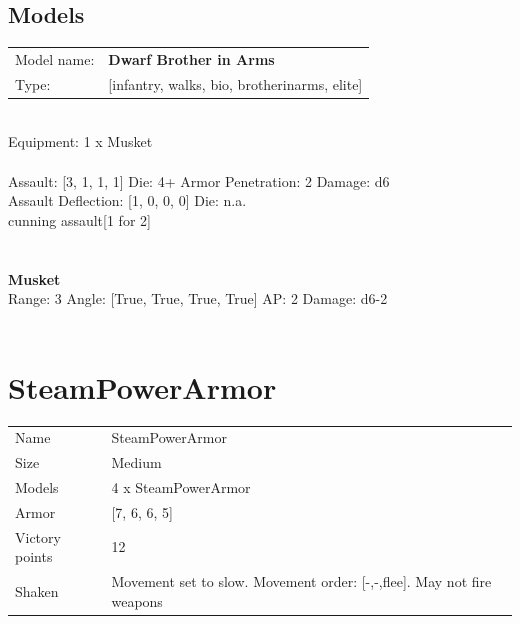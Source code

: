\subsection{ Models }

\begin{tabular}{ll}
Model name: & {\bf Dwarf Brother in Arms } \\
Type: & [infantry, walks, bio, brotherinarms, elite] \\
\end{tabular}
\ \\
Equipment: 1 x Musket \\
\ \\
Assault: [3, 1, 1, 1] Die: 4+ Armor Penetration: 2 Damage: d6 \\
Assault Deflection: [1, 0, 0, 0] Die: n.a.\\
\indent cunning assault[1 for 2]\\ 
 
\ \\

\ \\
{\bf Musket } \\



Range: 3  Angle: [True, True, True, True] AP: 2 Damage: d6-2 \\




 
\ \\














\clearpage

\section{ SteamPowerArmor }

\begin{tabular}{ll}
  Name & SteamPowerArmor \\
  Size & Medium\\
  Models & 4 x SteamPowerArmor\\
  Armor & [7, 6, 6, 5]\\
  Victory points & 12\\
  Shaken & Movement set to slow. Movement order: [-,-,flee]. May not fire weapons\\
\end{tabular}

